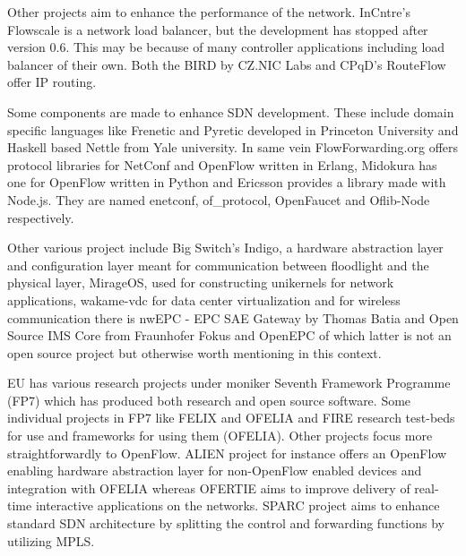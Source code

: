 \documentclass[english]{tktltiki2}
\theoremstyle{definition}
\theoremstyle{remark}
\begin{document}
Other projects aim to enhance the performance of the network. InCntre’s Flowscale is a network load balancer, but the development has stopped after version 0.6. This may be because of many controller applications including load balancer of their own. Both the BIRD by CZ.NIC Labs and CPqD’s RouteFlow offer IP routing.

Some components are made to enhance SDN development. These include domain specific languages like Frenetic and Pyretic developed in Princeton University and Haskell based Nettle from Yale university. In same vein FlowForwarding.org offers protocol libraries for NetConf and OpenFlow written in Erlang, Midokura has one for OpenFlow written in Python and Ericsson provides a library made with Node.js. They are named enetconf, of\_protocol, OpenFaucet and Oflib-Node respectively. 

Other various project include Big Switch’s Indigo, a hardware abstraction layer and configuration layer meant for communication between floodlight and the physical layer, MirageOS, used for constructing unikernels for network applications, wakame-vdc for data center virtualization and for wireless communication there is nwEPC - EPC SAE Gateway by Thomas Batia and Open Source IMS Core from Fraunhofer Fokus and OpenEPC of which latter is not an open source project but otherwise worth mentioning in this context. 

EU has various research projects under moniker Seventh Framework Programme (FP7) which has produced both research and open source software. Some individual projects in FP7 like FELIX and OFELIA and FIRE research test-beds for use and frameworks for using them (OFELIA). Other projects focus more straightforwardly to OpenFlow. ALIEN project for instance offers an OpenFlow enabling hardware abstraction layer for non-OpenFlow enabled devices and integration with OFELIA whereas OFERTIE aims to improve delivery of real-time interactive applications on the networks. SPARC project aims to enhance standard SDN architecture by splitting the control and forwarding functions by utilizing MPLS.





\clearpage






%
%
% 
%


% 





% 
\end{document}
